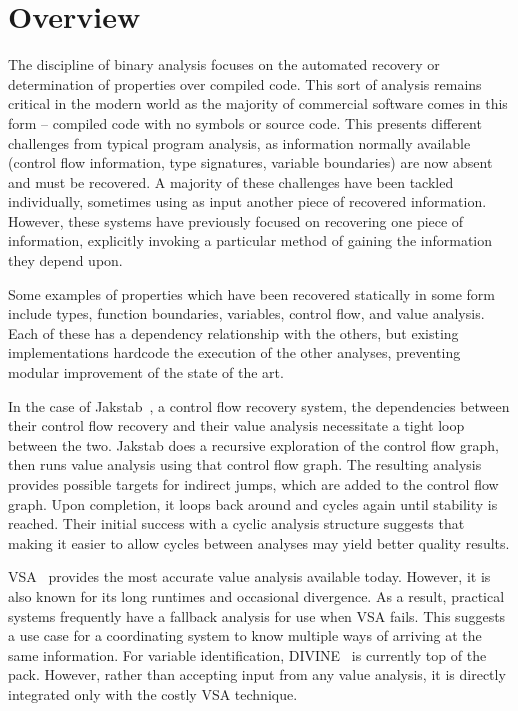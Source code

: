 
\section{Overview}
\label{sec:overview}
The discipline of binary analysis focuses on the automated recovery or determination of properties over compiled code.
This sort of analysis remains critical in the modern world as the majority of commercial software comes in this form -- compiled code with no symbols or source code.
This presents different challenges from typical program analysis, as information normally available (control flow information, type signatures, variable boundaries) are now absent and must be recovered.
A majority of these challenges have been tackled individually, sometimes using as input another piece of recovered information.
However, these systems have previously focused on recovering one piece of information, explicitly invoking a particular method of gaining the information they depend upon.

Some examples of properties which have been recovered statically in some form include types, function boundaries, variables, control flow, and value analysis.
Each of these has a dependency relationship with the others, but existing implementations hardcode the execution of the other analyses, preventing modular improvement of the state of the art.

In the case of Jakstab~\cite{jakstab}, a control flow recovery system, the dependencies between their control flow recovery and their value analysis necessitate a tight loop between the two.
Jakstab does a recursive exploration of the control flow graph, then runs value analysis using that control flow graph.
The resulting analysis provides possible targets for indirect jumps, which are added to the control flow graph.
Upon completion, it loops back around and cycles again until stability is reached.
Their initial success with a cyclic analysis structure suggests that making it easier to allow cycles between analyses may yield better quality results.

VSA~\cite{vsa} provides the most accurate value analysis available today. However, it is also known for its long runtimes and occasional divergence.
As a result, practical systems frequently have a fallback analysis for use when VSA fails.
This suggests a use case for a coordinating system to know multiple ways of arriving at the same information.
For variable identification, DIVINE~\cite{divine} is currently top of the pack.
However, rather than accepting input from any value analysis, it is directly integrated only with the costly VSA technique.


